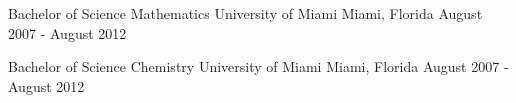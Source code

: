 

\begin{cventries}

  \cventry
    {Bachelor of Science Mathematics} %
    {University of Miami} %
    {Miami, Florida} %
    {August 2007 - August 2012} %
    {}

  \cventry
    {Bachelor of Science Chemistry} %
    {University of Miami} %
    {Miami, Florida} %
    {August 2007 - August 2012} %
    {}

\end{cventries}
